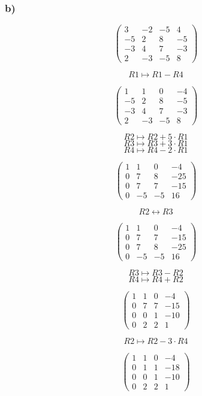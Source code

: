 \documentclass[10pt,a4paper]{article}
\begin{document}
\subsubsection*{b)}

$$
\begin{pmatrix}
3 & -2 & -5 & 4\\
-5 & 2 & 8 & -5\\
-3 & 4 & 7 & -3\\
2 & -3 & -5 & 8
\end{pmatrix}
$$

$$ R1 \longmapsto R1 - R4$$

$$
\begin{pmatrix}
1 & 1 & 0 & -4\\
-5 & 2 & 8 & -5\\
-3 & 4 & 7 & -3\\
2 & -3 & -5 & 8
\end{pmatrix}
$$

$$R2 \longmapsto R2 + 5\cdot R1$$
$$R3 \longmapsto R3 + 3\cdot R1$$
$$R4 \longmapsto R4 - 2\cdot R1$$

$$
\begin{pmatrix}
1 & 1 & 0 & -4\\
0 & 7 & 8 & -25\\
0 & 7 & 7 & -15\\
0 & -5 & -5 & 16
\end{pmatrix}
$$

$$R2 \leftrightarrow R3$$

$$
\begin{pmatrix}
1 & 1 & 0 & -4\\
0 & 7 & 7 & -15\\
0 & 7 & 8 & -25\\
0 & -5 & -5 & 16
\end{pmatrix}
$$

$$R3 \longmapsto R3 - R2$$
$$R4 \longmapsto R4 + R2$$

$$
\begin{pmatrix}
1 & 1 & 0 & -4\\
0 & 7 & 7 & -15\\
0 & 0 & 1 & -10\\
0 & 2 & 2 & 1
\end{pmatrix}
$$

$$R2 \longmapsto R2 - 3\cdot R4$$

$$
\begin{pmatrix}
1 & 1 & 0 & -4\\
0 & 1 & 1 & -18\\
0 & 0 & 1 & -10\\
0 & 2 & 2 & 1
\end{pmatrix}
$$
\end{document}

